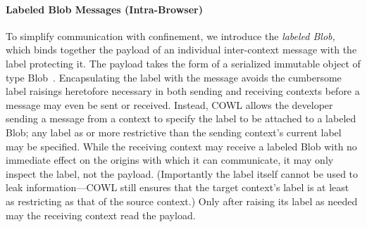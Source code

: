 \paragraph{Labeled Blob Messages (Intra-Browser)}
To simplify communication with confinement, we introduce the {\em
  labeled Blob,} which binds together the payload of an individual
inter-context message with the label protecting it. The payload takes
the form of a serialized immutable object of type Blob~\cite{html5}.
Encapsulating the label with the message avoids the cumbersome label
raisings heretofore necessary in both sending and receiving contexts
before a message may even be sent or received. Instead, COWL allows
the developer sending a message from a context to specify the label to
be attached to a labeled Blob; any label as or more restrictive than the
sending context's current label may be specified. While the receiving
context may receive a labeled Blob with no immediate effect on the
origins with which it can communicate, it may only inspect the label,
not the payload.
(Importantly the label itself cannot be used to leak
information---COWL still ensures that the target context's label is at
least as restricting as that of the source context.)
Only after raising its label as needed may the receiving context read
the payload.
%
%
%
%

